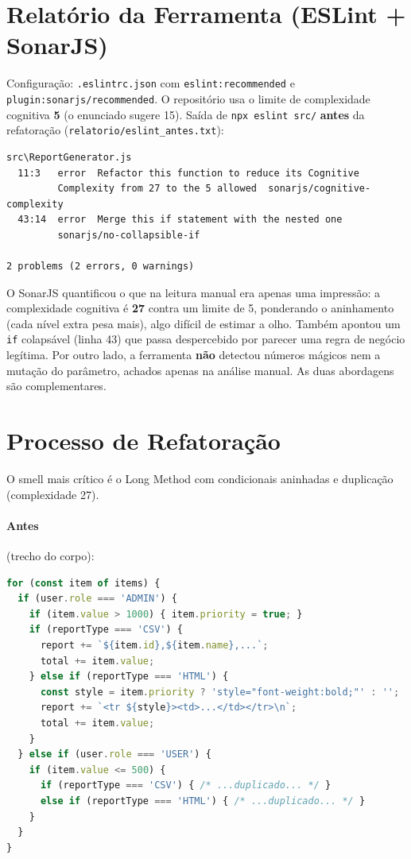 \documentclass[12pt,a4paper]{article}
\begin{document}
\section{Relatório da Ferramenta (ESLint + SonarJS)}
Configuração: \texttt{.eslintrc.json} com \texttt{eslint:recommended} e \texttt{plugin:sonarjs/recommended}. O repositório usa o limite de complexidade cognitiva \textbf{5} (o enunciado sugere 15). Saída de \texttt{npx eslint src/} \textbf{antes} da refatoração (\texttt{relatorio/eslint\_antes.txt}):

\begin{lstlisting}
src\ReportGenerator.js
  11:3   error  Refactor this function to reduce its Cognitive
         Complexity from 27 to the 5 allowed  sonarjs/cognitive-complexity
  43:14  error  Merge this if statement with the nested one
         sonarjs/no-collapsible-if

2 problems (2 errors, 0 warnings)
\end{lstlisting}

O SonarJS quantificou o que na leitura manual era apenas uma impressão: a complexidade cognitiva é \textbf{27} contra um limite de 5, ponderando o aninhamento (cada nível extra pesa mais), algo difícil de estimar a olho. Também apontou um \texttt{if} colapsável (linha 43) que passa despercebido por parecer uma regra de negócio legítima. Por outro lado, a ferramenta \textbf{não} detectou números mágicos nem a mutação do parâmetro, achados apenas na análise manual. As duas abordagens são complementares.

\section{Processo de Refatoração}
O smell mais crítico é o Long Method com condicionais aninhadas e duplicação (complexidade 27).

\paragraph{Antes} (trecho do corpo):
\begin{lstlisting}[language=JavaScript]
for (const item of items) {
  if (user.role === 'ADMIN') {
    if (item.value > 1000) { item.priority = true; }
    if (reportType === 'CSV') {
      report += `${item.id},${item.name},...`;
      total += item.value;
    } else if (reportType === 'HTML') {
      const style = item.priority ? 'style="font-weight:bold;"' : '';
      report += `<tr ${style}><td>...</td></tr>\n`;
      total += item.value;
    }
  } else if (user.role === 'USER') {
    if (item.value <= 500) {
      if (reportType === 'CSV') { /* ...duplicado... */ }
      else if (reportType === 'HTML') { /* ...duplicado... */ }
    }
  }
}
\end{lstlisting}
\end{document}
